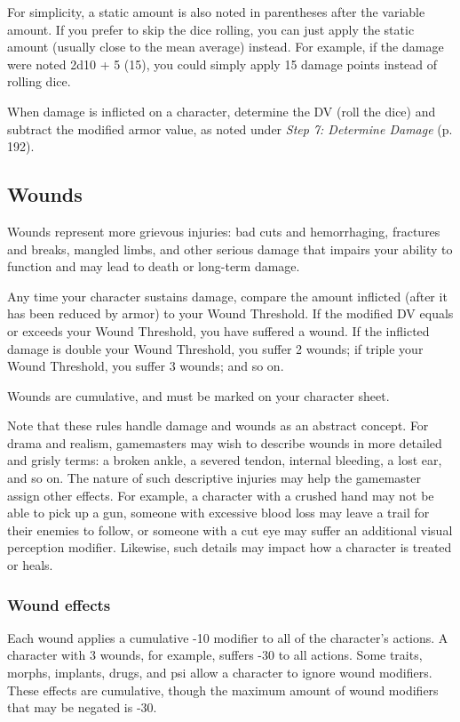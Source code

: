 For simplicity, a static amount is also noted in parentheses after the variable amount. If you prefer to skip the dice rolling, you can just apply the static amount (usually close to the mean average) instead. For example, if the damage were noted 2d10 + 5 (15), you could simply apply 15 damage points instead of rolling dice.

When damage is inflicted on a character, determine the DV (roll the dice) and subtract the modified armor value, as noted under \emph{Step 7: Determine Damage} (p. 192).

\subsection{Wounds}
\label{sec:wounds}

Wounds represent more grievous injuries: bad cuts and hemorrhaging, fractures and breaks, mangled limbs, and other serious damage that impairs your ability to function and may lead to death or long-term damage.

Any time your character sustains damage, compare the amount inflicted (after it has been reduced by armor) to your Wound Threshold. If the modified DV equals or exceeds your Wound Threshold, you have suffered a wound. If the inflicted damage is double your Wound Threshold, you suffer 2 wounds; if triple your Wound Threshold, you suffer 3 wounds; and so on.

Wounds are cumulative, and must be marked on your character sheet.

Note that these rules handle damage and wounds as an abstract concept. For drama and realism, gamemasters may wish to describe wounds in more detailed and grisly terms: a broken ankle, a severed tendon, internal bleeding, a lost ear, and so on. The nature of such descriptive injuries may help the gamemaster assign other effects. For example, a character with a crushed hand may not be able to pick up a gun, someone with excessive blood loss may leave a trail for their enemies to follow, or someone with a cut eye may suffer an additional visual perception modifier. Likewise, such details may impact how a character is treated or heals.

\subsubsection{Wound effects}

Each wound applies a cumulative -10 modifier to all of the character’s actions. A character with 3 wounds, for example, suffers -30 to all actions. Some traits, morphs, implants, drugs, and psi allow a character to ignore wound modifiers. These effects are cumulative, though the maximum amount of wound modifiers that may be negated is -30.

